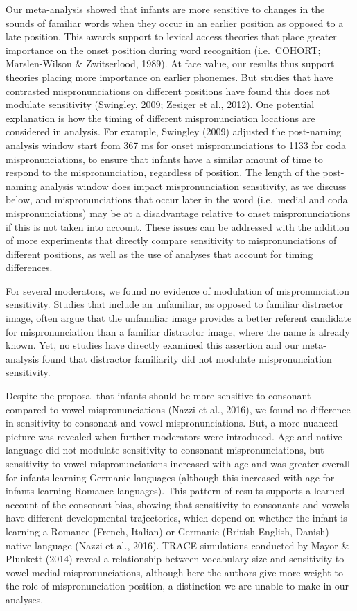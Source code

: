 \documentclass[
  man, noextraspace]{apa6}
\begin{document}
Our meta-analysis showed that infants are more sensitive to changes in the sounds of familiar words when they occur in an earlier position as opposed to a late position. This awards support to lexical access theories that place greater importance on the onset position during word recognition (i.e.~COHORT; Marslen-Wilson \& Zwitserlood, 1989). At face value, our results thus support theories placing more importance on earlier phonemes. But studies that have contrasted mispronunciations on different positions have found this does not modulate sensitivity (Swingley, 2009; Zesiger et al., 2012). One potential explanation is how the timing of different mispronunciation locations are considered in analysis. For example, Swingley (2009) adjusted the post-naming analysis window start from 367 ms for onset mispronunciations to 1133 for coda mispronunciations, to ensure that infants have a similar amount of time to respond to the mispronunciation, regardless of position. The length of the post-naming analysis window does impact mispronunciation sensitivity, as we discuss below, and mispronunciations that occur later in the word (i.e.~medial and coda mispronunciations) may be at a disadvantage relative to onset mispronunciations if this is not taken into account. These issues can be addressed with the addition of more experiments that directly compare sensitivity to mispronunciations of different positions, as well as the use of analyses that account for timing differences.

For several moderators, we found no evidence of modulation of mispronunciation sensitivity. Studies that include an unfamiliar, as opposed to familiar distractor image, often argue that the unfamiliar image provides a better referent candidate for mispronunciation than a familiar distractor image, where the name is already known. Yet, no studies have directly examined this assertion and our meta-analysis found that distractor familiarity did not modulate mispronunciation sensitivity.

Despite the proposal that infants should be more sensitive to consonant compared to vowel mispronunciations (Nazzi et al., 2016), we found no difference in sensitivity to consonant and vowel mispronunciations. But, a more nuanced picture was revealed when further moderators were introduced. Age and native language did not modulate sensitivity to consonant mispronunciations, but sensitivity to vowel mispronunciations increased with age and was greater overall for infants learning Germanic languages (although this increased with age for infants learning Romance languages). This pattern of results supports a learned account of the consonant bias, showing that sensitivity to consonants and vowels have different developmental trajectories, which depend on whether the infant is learning a Romance (French, Italian) or Germanic (British English, Danish) native language (Nazzi et al., 2016). TRACE simulations conducted by Mayor \& Plunkett (2014) reveal a relationship between vocabulary size and sensitivity to vowel-medial mispronunciations, although here the authors give more weight to the role of mispronunciation position, a distinction we are unable to make in our analyses.
\end{document}
